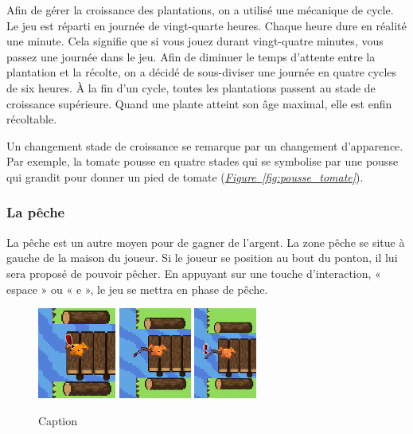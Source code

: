 \documentclass{article}
\begin{document}
    
        Afin de gérer la croissance des plantations,  on a utilisé une mécanique de cycle. Le jeu est réparti en journée de vingt-quarte heures. Chaque heure dure en réalité une minute. Cela signifie que si vous jouez durant vingt-quatre minutes, vous passez une journée dans le jeu. Afin de diminuer le temps d’attente entre la plantation et la récolte, on a décidé de sous-diviser une journée en quatre cycles de six heures. À la fin d’un cycle, toutes les plantations passent au stade de croissance supérieure. Quand une plante atteint son âge maximal, elle est enfin récoltable.

        Un changement stade de croissance se remarque par un changement d'apparence. Par exemple, la tomate pousse en quatre stades qui se symbolise par une pousse qui grandit pour donner un pied de tomate (\textit{\hyperref[fig:pousse_tomate]{Figure~\ref{fig:pousse_tomate}}}).
        
        \subsubsection{La pêche}
        La pêche est un autre moyen pour de gagner de l'argent. La zone pêche se situe à gauche de la maison du joueur. Si le joueur se position au bout du ponton, il lui sera proposé de pouvoir pêcher. En appuyant sur une touche d'interaction, « espace » ou « e », le jeu se mettra en phase de pêche.

        \begin{figure}[h]
            \centering
            \includegraphics[height = 3cm]{peche_action.png}
            \includegraphics[height = 3cm]{peche.png}
            \includegraphics[height = 3cm]{peche_plop.png}
            \caption{Caption}
            \label{fig:enter-label}
        \end{figure}
        
\end{document}
